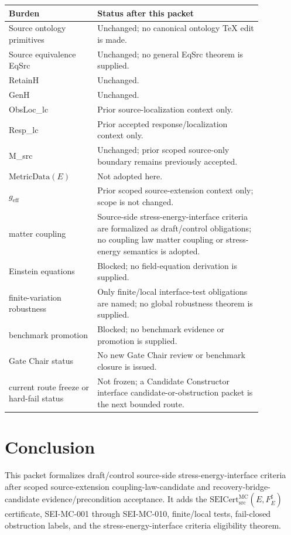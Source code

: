 \documentclass[11pt]{article}
\newcommand{\MetricData}{\mathrm{MetricData}}
\newcommand{\geff}{g_{\mathrm{eff}}}
\newcommand{\SEICert}{\mathrm{SEICert}_{\mathrm{src}}^{\mathrm{MC}}}
\begin{document}
\begin{longtable}{p{0.30\linewidth}p{0.56\linewidth}}
\toprule
Burden & Status after this packet \\
\midrule
Source ontology primitives & Unchanged; no canonical ontology TeX edit is made. \\
Source equivalence EqSrc & Unchanged; no general EqSrc theorem is supplied. \\
RetainH & Unchanged. \\
GenH & Unchanged. \\
ObsLoc\_lc & Prior source-localization context only. \\
Resp\_lc & Prior accepted response/localization context only. \\
M\_src & Unchanged; prior scoped source-only boundary remains previously accepted. \\
\(\MetricData(E)\) & Not adopted here. \\
\(\geff\) & Prior scoped source-extension context only; scope is not changed. \\
matter coupling & Source-side stress-energy-interface criteria are formalized as draft/control obligations; no coupling law matter coupling or stress-energy semantics is adopted. \\
Einstein equations & Blocked; no field-equation derivation is supplied. \\
finite-variation robustness & Only finite/local interface-test obligations are named; no global robustness theorem is supplied. \\
benchmark promotion & Blocked; no benchmark evidence or promotion is supplied. \\
Gate Chair status & No new Gate Chair review or benchmark closure is issued. \\
current route freeze or hard-fail status & Not frozen; a Candidate Constructor interface candidate-or-obstruction packet is the next bounded route. \\
\bottomrule
\end{longtable}

\section{Conclusion}

This packet formalizes draft/control source-side stress-energy-interface
criteria after scoped source-extension coupling-law-candidate and
recovery-bridge-candidate evidence/precondition acceptance. It adds the
\(\SEICert(E,F_E^\sharp)\) certificate, SEI-MC-001 through SEI-MC-010,
finite/local tests, fail-closed obstruction labels, and the
stress-energy-interface criteria eligibility theorem.
\end{document}
